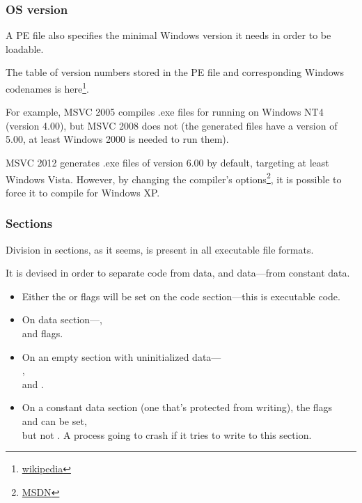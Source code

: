 \subsubsection{OS version}

A PE file also specifies the minimal Windows version it needs in order to be loadable.

The table of version numbers stored in the PE file and corresponding Windows codenames is
here\footnote{\href{http://go.yurichev.com/17044}{wikipedia}}.

For example, \ac{MSVC} 2005 compiles .exe files for running on Windows NT4 (version 4.00), but \ac{MSVC} 2008 does not 
(the generated files have a version of 5.00, at least Windows 2000 is needed to run them).


\ac{MSVC} 2012 generates .exe files of version 6.00 by default, 
targeting at least Windows Vista. 
However, by changing the compiler's options\footnote{\href{http://go.yurichev.com/17045}{MSDN}},
it is possible to force it to compile for Windows XP.

\subsubsection{Sections}

Division in sections, as it seems, is present in all executable file formats.

It is devised in order to separate code from data, and data---from constant data.

\begin{itemize}
\item Either the  or  flags will be set on the code section---this is executable code.

\item On data section---,\\
 and  flags.

\item On an empty section with uninitialized data---\\
,  \\
		and .

\item On a constant data section (one that's protected from writing), the flags \\
 and  can be set, \\
but not . 
A process going to crash if it tries to write to this section.
\end{itemize}

